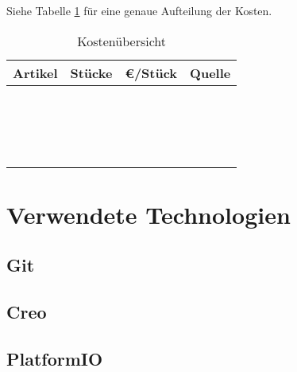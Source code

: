 Siehe Tabelle \ref{table:Kosten} für eine genaue Aufteilung der Kosten.
\begin{table}[!htbp]
	\centering
\begin{tabular}{|c|c|c|c|}
	\hline 
	Artikel & Stücke & \euro/Stück & Quelle \\ 
	\hline 
	\hline
	&  &  &  \\ 
	\hline
	&  &  &  \\ 
	\hline 
	&  &  &  \\ 
	\hline 
	&  &  &  \\ 
	\hline 
	&  &  &  \\ 
	\hline 
	&  &  &  \\ 
	\hline 
	&  &  &  \\ 
	\hline 
	&  &  &  \\ 
	\hline 
	&  &  &  \\ 
	\hline 
	&  &  &  \\ 
	\hline 
	&  &  &  \\ 
	\hline 
	&  &  &  \\ 
	\hline 
	&  &  &  \\ 
	\hline 
	&  &  &  \\ 
	\hline 
	&  &  &  \\ 
	\hline 
	&  &  &  \\ 
	\hline 
	&  &  &  \\ 
	\hline 
\end{tabular} 
\caption{Kostenübersicht} 
\label{table:Kosten}
\end{table} 



\section{Verwendete Technologien}

\subsection{Git}
\subsection{Creo}
\subsection{PlatformIO}